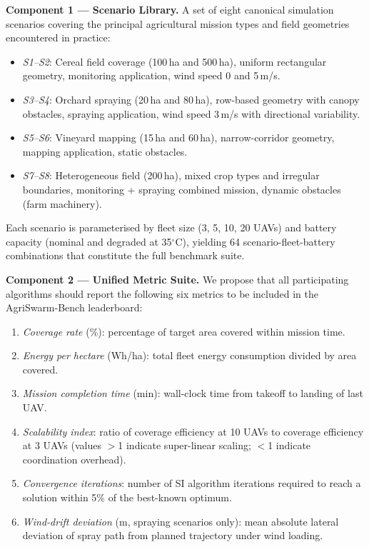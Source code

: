 \documentclass[review,3p,times]{elsarticle}
\begin{document}
\begin{itemize}
{\textbf{Component 1 --- Scenario Library.} A set of eight canonical simulation scenarios covering the principal agricultural mission types and field geometries encountered in practice:
\begin{itemize}
  \item \textit{S1--S2}: Cereal field coverage (100\,ha and 500\,ha), uniform rectangular geometry, monitoring application, wind speed 0 and 5\,m/s.
  \item \textit{S3--S4}: Orchard spraying (20\,ha and 80\,ha), row-based geometry with canopy obstacles, spraying application, wind speed 3\,m/s with directional variability.
  \item \textit{S5--S6}: Vineyard mapping (15\,ha and 60\,ha), narrow-corridor geometry, mapping application, static obstacles.
  \item \textit{S7--S8}: Heterogeneous field (200\,ha), mixed crop types and irregular boundaries, monitoring + spraying combined mission, dynamic obstacles (farm machinery).
\end{itemize}
Each scenario is parameterised by fleet size (3, 5, 10, 20 UAVs) and battery capacity (nominal and degraded at 35$^\circ$C), yielding 64 scenario-fleet-battery combinations that constitute the full benchmark suite.

\textbf{Component 2 --- Unified Metric Suite.} We propose that all participating algorithms should report the following six metrics to be included in the AgriSwarm-Bench leaderboard:
\begin{enumerate}
  \item \textit{Coverage rate} (\%): percentage of target area covered within mission time.
  \item \textit{Energy per hectare} (Wh/ha): total fleet energy consumption divided by area covered.
  \item \textit{Mission completion time} (min): wall-clock time from takeoff to landing of last UAV.
  \item \textit{Scalability index}: ratio of coverage efficiency at 10 UAVs to coverage efficiency at 3 UAVs (values $>$1 indicate super-linear scaling; $<$1 indicate coordination overhead).
  \item \textit{Convergence iterations}: number of SI algorithm iterations required to reach a solution within 5\% of the best-known optimum.
  \item \textit{Wind-drift deviation} (m, spraying scenarios only): mean absolute lateral deviation of spray path from planned trajectory under wind loading.
\end{enumerate}

}
\end{itemize}
\end{document}
